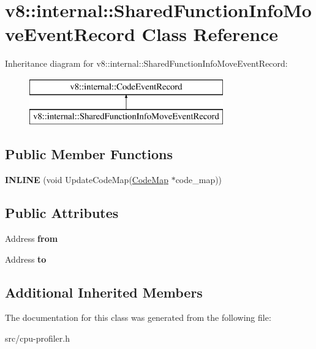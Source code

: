 \hypertarget{classv8_1_1internal_1_1_shared_function_info_move_event_record}{}\section{v8\+:\+:internal\+:\+:Shared\+Function\+Info\+Move\+Event\+Record Class Reference}
\label{classv8_1_1internal_1_1_shared_function_info_move_event_record}
Inheritance diagram for v8\+:\+:internal\+:\+:Shared\+Function\+Info\+Move\+Event\+Record\+:\begin{figure}[H]
\begin{center}
\leavevmode
\includegraphics[height=2.000000cm]{classv8_1_1internal_1_1_shared_function_info_move_event_record}
\end{center}
\end{figure}
\subsection*{Public Member Functions}
\begin{DoxyCompactItemize}
\item 
\hypertarget{classv8_1_1internal_1_1_shared_function_info_move_event_record_a64f955c89563c128f70443302a5513fd}{}{\bfseries I\+N\+L\+I\+N\+E} (void Update\+Code\+Map(\hyperlink{classv8_1_1internal_1_1_code_map}{Code\+Map} $\ast$code\+\_\+map))\label{classv8_1_1internal_1_1_shared_function_info_move_event_record_a64f955c89563c128f70443302a5513fd}

\end{DoxyCompactItemize}
\subsection*{Public Attributes}
\begin{DoxyCompactItemize}
\item 
\hypertarget{classv8_1_1internal_1_1_shared_function_info_move_event_record_a29cf3798bfe686ec506f5e1efc27fa72}{}Address {\bfseries from}\label{classv8_1_1internal_1_1_shared_function_info_move_event_record_a29cf3798bfe686ec506f5e1efc27fa72}

\item 
\hypertarget{classv8_1_1internal_1_1_shared_function_info_move_event_record_ac1dec98a17aa16a5c326558ad33de6da}{}Address {\bfseries to}\label{classv8_1_1internal_1_1_shared_function_info_move_event_record_ac1dec98a17aa16a5c326558ad33de6da}

\end{DoxyCompactItemize}
\subsection*{Additional Inherited Members}


The documentation for this class was generated from the following file\+:\begin{DoxyCompactItemize}
\item 
src/cpu-\/profiler.\+h\end{DoxyCompactItemize}
